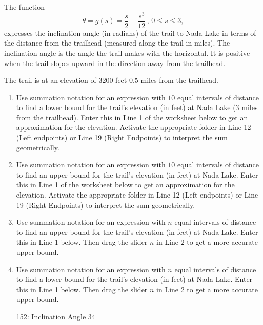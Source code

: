 \documentclass{ximera}
\begin{document}
\begin{question}  \label{QIIIUER3355}
The function
\[
      \theta = g(s) = \frac{s}{2} - \frac{s^3}{12} \, , \, 0\leq s \leq 3 , 
\]
expresses the inclination angle (in radians) of the trail to Nada Lake in terms of the distance from the trailhead (measured along the trail in miles). The inclination angle is the angle the trail makes with the horizontal. It is positive when the trail slopes upward in the direction away from the trailhead.

The trail is at an elevation of $3200$ feet $0.5$ miles from the trailhead.

\begin{enumerate}
\item Use summation notation for an expression with $10$ equal intervals of distance to find a lower bound for the trail's elevation (in feet) at Nada Lake (3 miles from the trailhead). Enter this in Line 1 of the worksheet below to get an approximation for the elevation. Activate the appropriate folder in Line 12 (Left endpoints) or Line 19 (Right Endpoints) to interpret the sum geometrically.

\item Use summation notation for an expression with $10$ equal intervals of distance to find an upper bound for the trail's elevation (in feet) at Nada Lake. Enter this in Line 1 of the worksheet below to get an approximation for the elevation. Activate the appropriate folder in Line 12 (Left endpoints) or Line 19 (Right Endpoints) to interpret the sum geometrically.


\item  Use summation notation for an expression with $n$ equal intervals of distance to find an upper bound for the trail's elevation (in feet) at Nada Lake. Enter this in Line 1 below. Then drag the slider $n$ in Line 2 to get a more accurate upper bound.

\item Use summation notation for an expression with $n$ equal intervals of distance to find a lower bound for the trail's elevation (in feet) at Nada Lake. Enter this in Line 1 below. Then drag the slider $n$ in Line 2 to get a more accurate upper bound.

\begin{onlineOnly}
    \begin{center}
\end{center}
\end{onlineOnly}
 
\href{https://www.desmos.com/calculator/qhyco8cuou}{152: Inclination Angle 34}

\end{enumerate}

\end{question}
\end{document}

